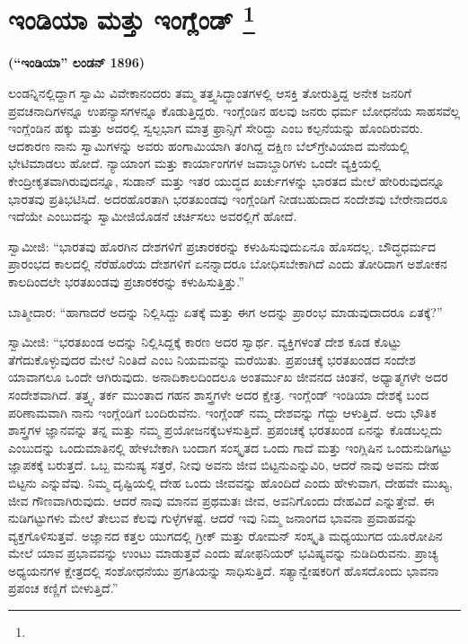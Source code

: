 
\chapter[ಇಂಡಿಯಾ ಮತ್ತು ಇಂಗ್ಲೆಂಡ್ ]{ಇಂಡಿಯಾ ಮತ್ತು ಇಂಗ್ಲೆಂಡ್ \protect\footnote{}}

\centerline{\textbf{(“ಇಂಡಿಯಾ” ಲಂಡನ್​ 1896)}}

\vskip 0.4cm

ಲಂಡನ್ನಿನಲ್ಲಿದ್ದಾಗ ಸ್ವಾಮಿ ವಿವೇಕಾನಂದರು ತಮ್ಮ ತತ್ತ್ವಸಿದ್ಧಾಂತಗಳಲ್ಲಿ ಆಸಕ್ತಿ ತೋರುತ್ತಿದ್ದ ಅನೇಕ ಜನರಿಗೆ ಪ್ರವಚನಾದಿಗಳನ್ನೂ ಉಪನ್ಯಾಸಗಳನ್ನೂ ಕೊಡುತ್ತಿದ್ದರು. ಇಂಗ್ಲೆಂಡಿನ ಹಲವು ಜನರು ಧರ್ಮ ಬೋಧನೆಯ ಸಾಹಸವೆಲ್ಲ ಇಂಗ್ಲೆಂಡಿನ ಹಕ್ಕು ಮತ್ತು ಅದರಲ್ಲಿ ಸ್ವಲ್ಪಭಾಗ ಮಾತ್ರ ಫ್ರಾನ್ಸಿಗೆ ಸೇರಿದ್ದು ಎಂಬ ಕಲ್ಪನೆಯನ್ನು ಹೊಂದಿರುವರು. ಆದಕಾರಣ ನಾನು ಸ್ವಾಮಿಗಳನ್ನು ಅವರು ಹಂಗಾಮಿಯಾಗಿ ತಂಗಿದ್ದ ದಕ್ಷಿಣ ಬೆಲ್​ಗ್ರೇವಿಯಾದ ಮನೆಯಲ್ಲಿ ಭೇಟಿಮಾಡಲು ಹೋದೆ. ನ್ಯಾಯಾಂಗ ಮತ್ತು ಕಾರ್ಯಾಂಗಗಳ ಜವಾಬ್ದಾರಿಗಳು ಒಂದೇ ವ್ಯಕ್ತಿಯಲ್ಲಿ ಕೇಂದ್ರೀಕೃತವಾಗಿರುವುದನ್ನೂ, ಸುಡಾನ್​ ಮತ್ತು ಇತರ ಯುದ್ಧದ ಖರ್ಚುಗಳನ್ನು ಭಾರತದ ಮೇಲೆ ಹೇರಿರುವುದನ್ನೂ ಭಾರತವು ಪ್ರತಿಭಟಿಸಿದೆ. ಅದರ\break ಹೊರತಾಗಿ ಭರತಖಂಡವು ಇಂಗ್ಲೆಂಡಿಗೆ ನೀಡಬಹುದಾದ ಸಂದೇಶವು ಬೇರೇನಾದರೂ ಇದೆಯೇ ಎಂಬುದನ್ನು ಸ್ವಾಮೀಜಿಯೊಡನೆ ಚರ್ಚಿಸಲು ಅವರಲ್ಲಿಗೆ ಹೋದೆ.

ಸ್ವಾಮೀಜಿ: “ಭಾರತವು ಹೊರಗಿನ ದೇಶಗಳಿಗೆ ಪ್ರಚಾರಕರನ್ನು ಕಳುಹಿಸುವುದು\break ಏನೂ ಹೊಸದಲ್ಲ. ಬೌದ್ಧಧರ್ಮದ ಪ್ರಾರಂಭದ ಕಾಲದಲ್ಲಿ ನೆರೆಹೊರೆಯ ದೇಶಗಳಿಗೆ ಏನನ್ನಾದರೂ ಬೋಧಿಸಬೇಕಾಗಿದೆ ಎಂದು ತೋರಿದಾಗ ಅಶೋಕನ ಕಾಲದಿಂದಲೇ ಭರತಖಂಡವು ಪ್ರಚಾರಕರನ್ನು ಕಳುಹಿಸುತ್ತಿತ್ತು.”

ಬಾತ್ಮೀದಾರ: “ಹಾಗಾದರೆ ಅದನ್ನು ನಿಲ್ಲಿಸಿದ್ದು ಏತಕ್ಕೆ ಮತ್ತು ಈಗ ಅದನ್ನು ಪ್ರಾರಂಭ ಮಾಡುವುದಾದರೂ ಏತಕ್ಕೆ?”

ಸ್ವಾಮೀಜಿ: “ಭರತಖಂಡ ಅದನ್ನು ನಿಲ್ಲಿಸಿದ್ದಕ್ಕೆ ಕಾರಣ ಅದರ ಸ್ವಾರ್ಥ. ವ್ಯಕ್ತಿಗಳಂತೆ ದೇಶ ಕೂಡ ಕೊಟ್ಟು ತೆಗೆದುಕೊಳ್ಳುವುದರ ಮೇಲೆ ನಿಂತಿದೆ ಎಂಬ ನಿಯಮವನ್ನು ಮರೆಯಿತು. ಪ್ರಪಂಚಕ್ಕೆ ಭರತಖಂಡದ ಸಂದೇಶ ಯಾವಾಗಲೂ ಒಂದೇ ಆಗಿರುವುದು. ಅನಾದಿಕಾಲದಿಂದಲೂ ಅಂತರ್ಮುಖ ಜೀವನದ ಚಿಂತನೆ, ಅಧ್ಯಾತ್ಮಗಳೇ ಅದರ ಸಂದೇಶವಾಗಿದೆ. ತತ್ತ್ವ, ತರ್ಕ ಮುಂತಾದ ಗಹನ ಶಾಸ್ತ್ರಗಳೇ ಅದರ ಕ್ಷೇತ್ರ. ಇಂಗ್ಲೆಂಡ್​ ಇಂಡಿಯಾ ದೇಶಕ್ಕೆ ಬಂದ ಪರಿಣಾಮವಾಗಿ ನಾನು ಇಂಗ್ಲೆಂಡಿಗೆ ಬಂದಿರುವೆನು. ಇಂಗ್ಲೆಂಡ್​ ನಮ್ಮ ದೇಶವನ್ನು ಗೆದ್ದು ಆಳುತ್ತಿದೆ. ಅದು ಭೌತಿಕ ಶಾಸ್ತ್ರಗಳ ಜ್ಞಾನವನ್ನು ತನ್ನ ಮತ್ತು ನಮ್ಮ ಪ್ರಯೋಜನಕ್ಕೆ\break ಬಳಸುತ್ತಿದೆ. ಪ್ರಪಂಚಕ್ಕೆ ಭರತಖಂಡ ಏನನ್ನು ಕೊಡಬಲ್ಲದು ಎಂಬುದನ್ನು ಒಂದು\break ಮಾತಿನಲ್ಲಿ ಹೇಳಬೇಕಾಗಿ ಬಂದಾಗ ಸಂಸ್ಕೃತದ ಒಂದು ಗಾದೆ ಮತ್ತು ಇಂಗ್ಲಿಷಿನ ಒಂದು\break ನುಡಿಗಟ್ಟು ಜ್ಞಾಪಕಕ್ಕೆ ಬರುತ್ತದೆ. ಒಬ್ಬ ಮನುಷ್ಯ ಸತ್ತರೆ, ನೀವು ಅವನು ಜೀವ ಬಿಟ್ಟನು\break ಎನ್ನುವಿರಿ, ಆದರೆ ನಾವು ಅವನು ದೇಹ ಬಿಟ್ಟನು ಎನ್ನುವೆವು. ನಿಮ್ಮ ದೃಷ್ಟಿಯಲ್ಲಿ ದೇಹ ಒಂದು ಜೀವವನ್ನು ಹೊಂದಿದೆ ಎಂದು ಹೇಳುವಾಗ, ದೇಹವೇ ಮುಖ್ಯ, ಜೀವ ಗೌಣವಾಗಿರುವುದು. ಆದರೆ ನಾವು ಮಾನವ ಪ್ರಥಮತಃ ಜೀವ, ಅವನಿಗೊಂದು ದೇಹವಿದೆ ಎನ್ನುತ್ತೇವೆ. ಈ ನುಡಿಗಟ್ಟುಗಳು ಮೇಲೆ ತೇಲುವ ಕೆಲವು ಗುಳ್ಳೆಗಳಷ್ಟೆ. ಆದರೆ ಇವು ನಿಮ್ಮ ಜನಾಂಗದ ಭಾವನಾ ಪ್ರವಾಹವನ್ನು ವ್ಯಕ್ತಗೊಳಿಸುತ್ತವೆ. ಅಜ್ಞಾನದ ಕತ್ತಲ ಯುಗದಲ್ಲಿ ಗ್ರೀಕ್​ ಮತ್ತು ರೋಮನ್​ ಸಂಸ್ಕೃತಿ ಮಧ್ಯಯುಗದ ಯೂರೋಪಿನ ಮೇಲೆ ಯಾವ ಪ್ರಭಾವವನ್ನು ಉಂಟು ಮಾಡುತ್ತವೆ ಎಂದು ಷೋಫನಿಯರ್​ ಭವಿಷ್ಯವನ್ನು ನುಡಿದಿರುವನು. ಪ್ರಾಚ್ಯ ಅಧ್ಯಯನಗಳ ಕ್ಷೇತ್ರದಲ್ಲಿ ಸಂಶೋಧನೆಯು ಪ್ರಗತಿಯನ್ನು ಸಾಧಿಸುತ್ತಿದೆ. ಸತ್ಯಾನ್ವೇಷಕರಿಗೆ ಹೊಸದೊಂದು ಭಾವನಾ ಪ್ರಪಂಚ ಕಣ್ಣಿಗೆ ಬೀಳುತ್ತಿದೆ.”

